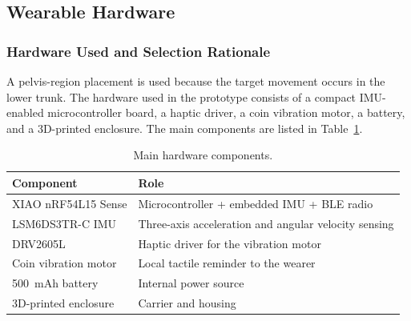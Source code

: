 \subsection{Wearable Hardware}\label{sec:wearable_hardware}

\subsubsection{Hardware Used and Selection Rationale}

A pelvis-region placement is used because the target movement occurs in the lower trunk. The hardware used in the prototype consists of a compact IMU-enabled microcontroller board, a haptic driver, a coin vibration motor, a battery, and a 3D-printed enclosure. The main components are listed in Table~\ref{tab:prototype_components}.

\begin{table}[!htbp]
    \centering
    \footnotesize
    \caption{Main hardware components.}
    \label{tab:prototype_components}
    \begin{tabularx}{\linewidth}{lX}
        \toprule
        Component & Role \\
        \midrule
        XIAO nRF54L15 Sense & Microcontroller + embedded IMU + BLE radio \\
        LSM6DS3TR-C IMU & Three-axis acceleration and angular velocity sensing \\
        DRV2605L & Haptic driver for the vibration motor \\
        Coin vibration motor & Local tactile reminder to the wearer \\
        500~mAh battery & Internal power source \\
        3D-printed enclosure & Carrier and housing \\
        \bottomrule
    \end{tabularx}
\end{table}

